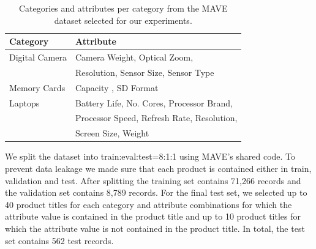 \begin{table}[h]
\caption{Categories and attributes per category from the MAVE dataset selected for our experiments.}
\label{tab:categories_attributes}
\begin{tabular}{@{}ll@{}}
\toprule
\textbf{Category}           & \textbf{Attribute}     \\ \midrule
Digital Camera     & Camera Weight, Optical Zoom,        \\ 
                   &  Resolution, Sensor Size, Sensor Type   \\ \midrule
Memory Cards &  Capacity , SD Format                          \\ \midrule
Laptops            & Battery Life, No. Cores, Processor Brand,      \\
                   &  Processor Speed, Refresh Rate, Resolution,  \\
                   & Screen Size, Weight \\ \bottomrule
\end{tabular}
\end{table}


We split the dataset into train:eval:test=8:1:1 using MAVE's shared code. To prevent data leakage we made sure that each product is contained either in train, validation and test. After splitting the training set contains 71,266 records and the validation set contains 8,789 records.
For the final test set, we selected up to 40 product titles for each category and attribute combinations  
for which the attribute value is contained in the product title and up to 10 product titles for which the attribute value is not contained in the product title. In total, the test set contains 562 test records.

